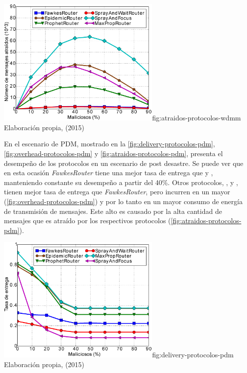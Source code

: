 {\includegraphics[width=0.6\textwidth]{imagenes/seguridad/graficos/atraidos_comparacion.eps}}{fig:atraidos-protocolos-wdmm}
{Elaboración propia, (2015)}




En el escenario de PDM, mostrado en la \ref{fig:delivery-protocolos-pdm},
\ref{fig:overhead-protocolos-pdm} y \ref{fig:atraidos-protocolos-pdm},
presenta el desempeño de los protocolos en un escenario de post desastre. Se
puede ver que en esta ocasión \textit{FawkesRouter} tiene una mejor tasa de
entrega que \syf{} y \syw{}, manteniendo constante su desempeño a partir del
40\%. Otros protocolos, \prophet, \maxprop{} y \epidemic, tienen mejor tasa de
entrega que \textit{FawkesRouter}, pero incurren en un mayor \overhead{}
(\ref{fig:overhead-protocolos-pdm}) y por lo tanto en un mayor consumo de energía
de transmisión de mensajes. Este alto \overhead{} es causado por la alta
cantidad de mensajes que es atraído por los respectivos protocolos
(\ref{fig:atraidos-protocolos-pdm}).





{\includegraphics[width=0.6\textwidth]{imagenes/seguridad/graficos/delivery_pdm_todos.eps}}{fig:delivery-protocolos-pdm}
{Elaboración propia, (2015)}

